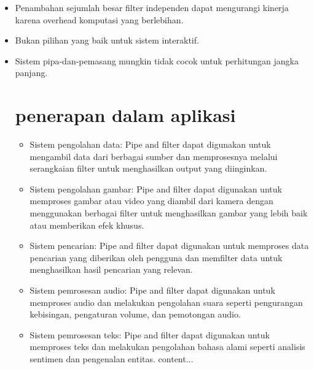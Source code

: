 	\begin{itemize}
		\item 	Penambahan sejumlah besar filter independen dapat mengurangi kinerja karena overhead komputasi yang berlebihan.
		\item Bukan pilihan yang baik untuk sistem interaktif.
		\item Sistem pipa-dan-pemasang mungkin tidak cocok untuk perhitungan jangka panjang.
		
	\section{penerapan dalam aplikasi}
	\begin{itemize}
		\item Sistem pengolahan data: Pipe and filter dapat digunakan untuk mengambil data dari berbagai sumber dan memprosesnya melalui serangkaian filter untuk menghasilkan output yang diinginkan.
			
		\item Sistem pengolahan gambar: Pipe and filter dapat digunakan untuk memproses gambar atau video yang diambil dari kamera dengan menggunakan berbagai filter untuk menghasilkan gambar yang lebih baik atau memberikan efek khusus.
			
		\item Sistem pencarian: Pipe and filter dapat digunakan untuk memproses data pencarian yang diberikan oleh pengguna dan memfilter data untuk menghasilkan hasil pencarian yang relevan.
			
		\item Sistem pemrosesan audio: Pipe and filter dapat digunakan untuk memproses audio dan melakukan pengolahan suara seperti pengurangan kebisingan, pengaturan volume, dan pemotongan audio.
			
		\item Sistem pemrosesan teks: Pipe and filter dapat digunakan untuk memproses teks dan melakukan pengolahan bahasa alami seperti analisis sentimen dan pengenalan entitas.
			content...
		\end{itemize}
	\end{itemize}

